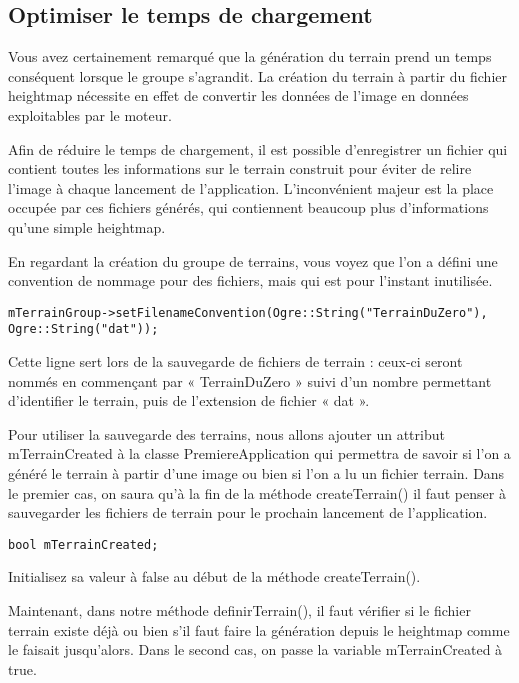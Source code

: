 \subsection{Optimiser le temps de chargement}

Vous avez certainement remarqu\'e que la g\'en\'eration du terrain prend un temps cons\'equent lorsque le groupe s'agrandit. La cr\'eation du terrain \`a partir du fichier heightmap n\'ecessite en effet de convertir les donn\'ees de l'image en donn\'ees exploitables par le moteur.

Afin de r\'eduire le temps de chargement, il est possible d'enregistrer un fichier qui contient toutes les informations sur le terrain construit pour \'eviter de relire l'image \`a chaque lancement de l'application. L'inconv\'enient majeur est la place occup\'ee par ces fichiers g\'en\'er\'es, qui contiennent beaucoup plus d'informations qu'une simple heightmap.

En regardant la cr\'eation du groupe de terrains, vous voyez que l'on a d\'efini une convention de nommage pour des fichiers, mais qui est pour l'instant inutilis\'ee.

\begin{lstlisting}[caption={}]
mTerrainGroup->setFilenameConvention(Ogre::String("TerrainDuZero"), Ogre::String("dat"));
\end{lstlisting}

Cette ligne sert lors de la sauvegarde de fichiers de terrain : ceux-ci seront nomm\'es en commençant par « TerrainDuZero » suivi d'un nombre permettant d'identifier le terrain, puis de l'extension de fichier « dat ».

Pour utiliser la sauvegarde des terrains, nous allons ajouter un attribut mTerrainCreated \`a la classe PremiereApplication qui permettra de savoir si l'on a g\'en\'er\'e le terrain \`a partir d'une image ou bien si l'on a lu un fichier terrain. Dans le premier cas, on saura qu'\`a la fin de la m\'ethode createTerrain() il faut penser \`a sauvegarder les fichiers de terrain pour le prochain lancement de l'application.

\begin{lstlisting}[caption={}]
bool mTerrainCreated;
\end{lstlisting}

Initialisez sa valeur \`a false au d\'ebut de la m\'ethode createTerrain().

Maintenant, dans notre m\'ethode definirTerrain(), il faut v\'erifier si le fichier terrain existe d\'ej\`a ou bien s'il faut faire la g\'en\'eration depuis le heightmap comme le faisait jusqu'alors. Dans le second cas, on passe la variable mTerrainCreated \`a true.

